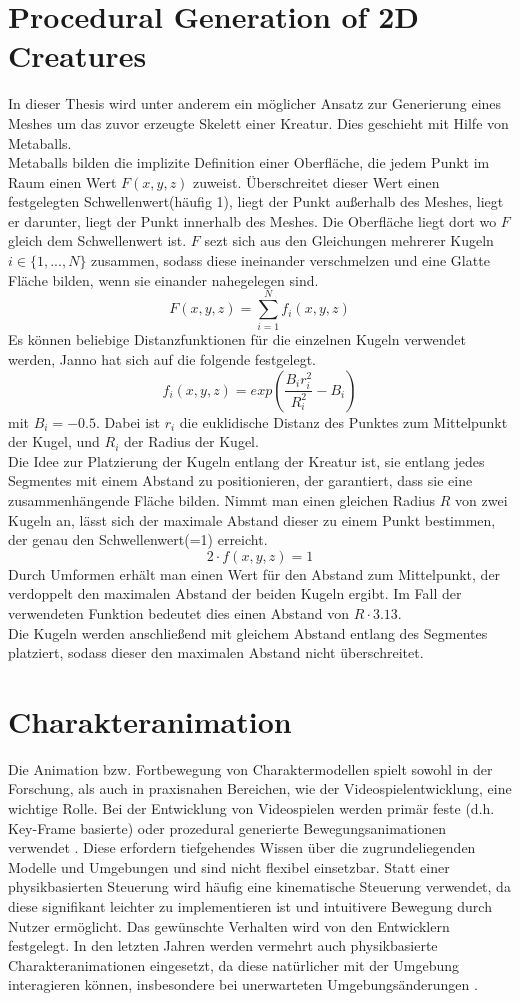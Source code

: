 \section{Procedural Generation of 2D Creatures}
In dieser Thesis \cite{Janno20182dCG} wird unter anderem ein möglicher Ansatz zur Generierung eines Meshes um das zuvor erzeugte Skelett einer Kreatur. Dies geschieht mit Hilfe von Metaballs.\\
Metaballs bilden die implizite Definition einer Oberfläche, die jedem Punkt im Raum einen Wert $F(x,y,z)$ zuweist. Überschreitet dieser Wert einen festgelegten Schwellenwert(häufig 1), liegt der Punkt außerhalb des Meshes, liegt er darunter, liegt der Punkt innerhalb des Meshes. Die Oberfläche liegt dort wo $F$ gleich dem Schwellenwert ist. $F$ sezt sich aus den Gleichungen mehrerer Kugeln $i\in \{ 1, ..., N\}$ zusammen, sodass diese ineinander verschmelzen und eine Glatte Fläche bilden, wenn sie einander nahegelegen sind.
\[F(x,y,z) = \sum_{i=1}^{N}{f_i(x,y,z)}\]
Es können beliebige Distanzfunktionen für die einzelnen Kugeln verwendet werden, Janno hat sich auf die folgende festgelegt.
\[f_i(x,y,z)=exp(\frac{B_ir_i^2}{R_i^2}-B_i)\]
mit $B_i=-0.5$. Dabei ist $r_i$ die euklidische Distanz des Punktes zum Mittelpunkt der Kugel, und $R_i$ der Radius der Kugel.\\
Die Idee zur Platzierung der Kugeln entlang der Kreatur ist, sie entlang jedes Segmentes mit einem Abstand zu positionieren, der garantiert, dass sie eine zusammenhängende Fläche bilden. Nimmt man einen gleichen Radius $R$ von zwei Kugeln an, lässt sich der maximale Abstand dieser zu einem Punkt bestimmen, der genau den Schwellenwert(=1) erreicht.
\[2\cdot f(x,y,z) = 1\]
Durch Umformen erhält man einen Wert für den Abstand zum Mittelpunkt, der verdoppelt den maximalen Abstand der beiden Kugeln ergibt. Im Fall der verwendeten Funktion bedeutet dies einen Abstand von $R \cdot 3.13$.\\
Die Kugeln werden anschließend mit gleichem Abstand entlang des Segmentes platziert, sodass dieser den maximalen Abstand nicht überschreitet.

\section{Charakteranimation}
Die Animation bzw. Fortbewegung von Charaktermodellen spielt sowohl in der Forschung, als auch in praxisnahen Bereichen, wie der Videospielentwicklung, eine wichtige Rolle.
Bei der Entwicklung von Videospielen werden primär feste (d.h. Key-Frame basierte) oder prozedural generierte Bewegungsanimationen verwendet \cite{keyframe_animation}. Diese erfordern tiefgehendes Wissen über die zugrundeliegenden Modelle und Umgebungen und sind nicht flexibel einsetzbar. Statt einer physikbasierten Steuerung wird häufig eine kinematische Steuerung verwendet, da diese signifikant leichter zu implementieren ist und intuitivere Bewegung durch Nutzer ermöglicht. Das gewünschte Verhalten wird von den Entwicklern festgelegt. In den letzten Jahren werden vermehrt auch physikbasierte Charakteranimationen eingesetzt, da diese natürlicher mit der Umgebung interagieren können, insbesondere bei unerwarteten Umgebungsänderungen \cite{Geijtenbeek2012}.

